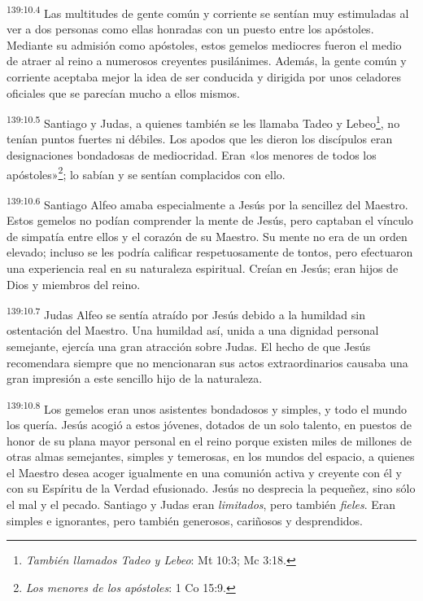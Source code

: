 \par
\textsuperscript{139:10.4} Las multitudes de gente común y corriente se sentían muy estimuladas al ver a dos personas como ellas honradas con un puesto entre los apóstoles. Mediante su admisión como apóstoles, estos gemelos mediocres fueron el medio de atraer al reino a numerosos creyentes pusilánimes. Además, la gente común y corriente aceptaba mejor la idea de ser conducida y dirigida por unos celadores oficiales que se parecían mucho a ellos mismos.

\par
\textsuperscript{139:10.5} Santiago y Judas, a quienes también se les llamaba Tadeo y Lebeo\footnote{\textit{También llamados Tadeo y Lebeo}: Mt 10:3; Mc 3:18.}, no tenían puntos fuertes ni débiles. Los apodos que les dieron los discípulos eran designaciones bondadosas de mediocridad. Eran «los menores de todos los apóstoles»\footnote{\textit{Los menores de los apóstoles}: 1 Co 15:9.}; lo sabían y se sentían complacidos con ello.

\par
\textsuperscript{139:10.6} Santiago Alfeo amaba especialmente a Jesús por la sencillez del Maestro. Estos gemelos no podían comprender la mente de Jesús, pero captaban el vínculo de simpatía entre ellos y el corazón de su Maestro. Su mente no era de un orden elevado; incluso se les podría calificar respetuosamente de tontos, pero efectuaron una experiencia real en su naturaleza espiritual. Creían en Jesús; eran hijos de Dios y miembros del reino.

\par
\textsuperscript{139:10.7} Judas Alfeo se sentía atraído por Jesús debido a la humildad sin ostentación del Maestro. Una humildad así, unida a una dignidad personal semejante, ejercía una gran atracción sobre Judas. El hecho de que Jesús recomendara siempre que no mencionaran sus actos extraordinarios causaba una gran impresión a este sencillo hijo de la naturaleza.

\par
\textsuperscript{139:10.8} Los gemelos eran unos asistentes bondadosos y simples, y todo el mundo los quería. Jesús acogió a estos jóvenes, dotados de un solo talento, en puestos de honor de su plana mayor personal en el reino porque existen miles de millones de otras almas semejantes, simples y temerosas, en los mundos del espacio, a quienes el Maestro desea acoger igualmente en una comunión activa y creyente con él y con su Espíritu de la Verdad efusionado. Jesús no desprecia la pequeñez, sino sólo el mal y el pecado. Santiago y Judas eran \textit{limitados}, pero también \textit{fieles}. Eran simples e ignorantes, pero también generosos, cariñosos y desprendidos.


